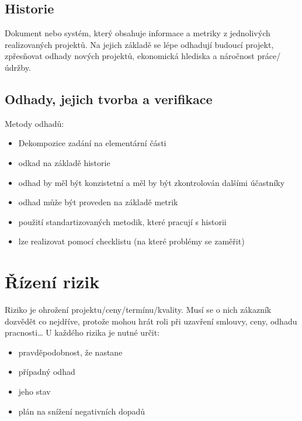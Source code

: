 \documentclass{szzclass}
\begin{document}
\subsection{Historie}
Dokument nebo systém, který obsahuje informace a metriky z jednolivých realizovaných projektů.
Na jejich základě se lépe odhadují budoucí projekt, zpřesňovat odhady nových projektů, ekonomická hlediska a náročnost práce/údržby.
\subsection{Odhady, jejich tvorba a verifikace}
Metody odhadů:
\begin{itemize}
    \item Dekompozice zadání na elementární části
    \item odkad na základě historie
    \item odhad by měl být konzistetní a měl by být zkontrolován dalšími účastníky
    \item odhad může být proveden na základě metrik
    \item použití standartizovaných metodik, které pracují s historii
    \item lze realizovat pomocí checklistu (na které problémy se zaměřit)
\end{itemize}
\section{Řízení rizik}
Riziko je ohrožení projektu/ceny/termínu/kvality. Musí se o nich zákazník dozvědět co nejdříve, protože mohou hrát roli
při uzavření smlouvy, ceny, odhadu pracnosti\dots
U každého rizika je nutné určit:
\begin{itemize}
    \item pravděpodobnost, že nastane
    \item případný odhad
    \item jeho stav
    \item plán na snížení negativních dopadů
\end{itemize}
\end{document}
